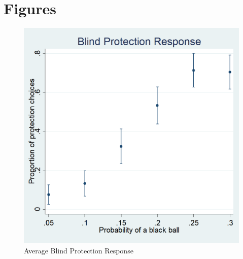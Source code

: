 \documentclass[11pt,a4paper]{article}
\begin{document}
%

%


%
%
%




%

%

%

%


%
\vspace{40pt}
\newpage

\newpage

\section{Figures}

\begin{figure}[H]
\centering
\caption{Average Blind Protection Response} \label{Blind Protection Responses}

  \centering
  \includegraphics[scale=0.3]{Graphs/blind_prot_sta.png}

\end{figure}
\end{document}
